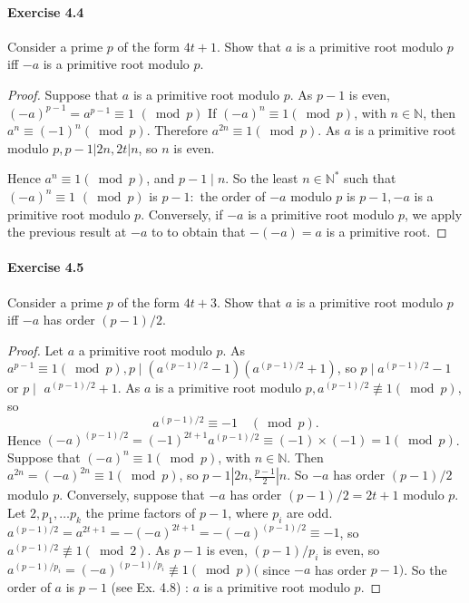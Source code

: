 \documentclass{article}
\begin{document}
\paragraph{Exercise 4.4} Consider a prime $p$ of the form $4 t+1$. Show that $a$ is a primitive root modulo $p$ iff $-a$ is a primitive root modulo $p$.
\begin{proof}
    Suppose that $a$ is a primitive root modulo $p$. As $p-1$ is even, $(-a)^{p-1}=a^{p-1} \equiv 1$ $(\bmod p)$
If $(-a)^n \equiv 1(\bmod p)$, with $n \in \mathbb{N}$, then $a^n \equiv(-1)^n(\bmod p)$.
Therefore $a^{2 n} \equiv 1(\bmod p)$. As $a$ is a primitive root modulo $p, p-1|2 n, 2 t| n$, so $n$ is even.

Hence $a^n \equiv 1(\bmod p)$, and $p-1 \mid n$. So the least $n \in \mathbb{N}^*$ such that $(-a)^n \equiv 1$ $(\bmod p)$ is $p-1:$ the order of $-a$ modulo $p$ is $p-1,-a$ is a primitive root modulo $p$. Conversely, if $-a$ is a primitive root modulo $p$, we apply the previous result at $-a$ to to obtain that $-(-a)=a$ is a primitive root.
\end{proof}



\paragraph{Exercise 4.5} Consider a prime $p$ of the form $4 t+3$. Show that $a$ is a primitive root modulo $p$ iff $-a$ has order $(p-1) / 2$.
\begin{proof}
    Let $a$ a primitive root modulo $p$.
As $a^{p-1} \equiv 1(\bmod p), p \mid\left(a^{(p-1) / 2}-1\right)\left(a^{(p-1) / 2}+1\right)$, so $p \mid a^{(p-1) / 2}-1$ or $p \mid$ $a^{(p-1) / 2}+1$. As $a$ is a primitive root modulo $p, a^{(p-1) / 2} \not \equiv 1(\bmod p)$, so
$$
a^{(p-1) / 2} \equiv-1 \quad(\bmod p) .
$$
Hence $(-a)^{(p-1) / 2}=(-1)^{2 t+1} a^{(p-1) / 2} \equiv(-1) \times(-1)=1(\bmod p)$.
Suppose that $(-a)^n \equiv 1(\bmod p)$, with $n \in \mathbb{N}$.
Then $a^{2 n}=(-a)^{2 n} \equiv 1(\bmod p)$, so $p-1\left|2 n, \frac{p-1}{2}\right| n$.
So $-a$ has order $(p-1) / 2$ modulo $p$.
Conversely, suppose that $-a$ has order $(p-1) / 2=2 t+1$ modulo $p$. Let $2, p_1, \ldots p_k$ the prime factors of $p-1$, where $p_i$ are odd.
$a^{(p-1) / 2}=a^{2 t+1}=-(-a)^{2 t+1}=-(-a)^{(p-1) / 2} \equiv-1$, so $a^{(p-1) / 2} \not \equiv 1(\bmod 2)$.
As $p-1$ is even, $(p-1) / p_i$ is even, so $a^{(p-1) / p_i}=(-a)^{(p-1) / p_i} \not \equiv 1(\bmod p)($ since $-a$ has order $p-1)$.
So the order of $a$ is $p-1$ (see Ex. 4.8) : $a$ is a primitive root modulo $p$.
\end{proof}
\end{document}
